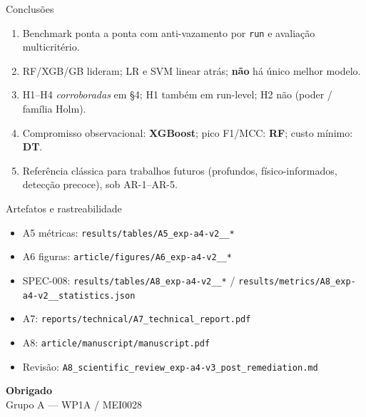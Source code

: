 \documentclass[aspectratio=169,11pt]{beamer}
\begin{document}
\begin{frame}{Conclusões}
\begin{enumerate}
  \item Benchmark ponta a ponta com anti-vazamento por \texttt{run} e avaliação multicritério.
  \item RF/XGB/GB lideram; LR e SVM linear atrás; \textbf{não} há único melhor modelo.
  \item H1--H4 \emph{corroboradas} em §4; H1 também em run-level; H2 não (poder / família Holm).
  \item Compromisso observacional: \textbf{XGBoost}; pico F1/MCC: \textbf{RF}; custo mínimo: \textbf{DT}.
  \item Referência clássica para trabalhos futuros (profundos, físico-informados, detecção precoce),
        sob AR-1--AR-5.
\end{enumerate}
\end{frame}

\begin{frame}{Artefatos e rastreabilidade}
\begin{itemize}
  \item A5 métricas: \texttt{results/tables/A5\_exp-a4-v2\_\_*}
  \item A6 figuras: \texttt{article/figures/A6\_exp-a4-v2\_\_*}
  \item SPEC-008: \texttt{results/tables/A8\_exp-a4-v2\_\_*} /
        \texttt{results/metrics/A8\_exp-a4-v2\_\_statistics.json}
  \item A7: \texttt{reports/technical/A7\_technical\_report.pdf}
  \item A8: \texttt{article/manuscript/manuscript.pdf}
  \item Revisão: \texttt{A8\_scientific\_review\_exp-a4-v3\_post\_remediation.md}
\end{itemize}
\bigskip
\begin{center}
\textbf{Obrigado}\\[0.5em]
{\small Grupo A --- WP1A / MEI0028}
\end{center}
\end{frame}
\end{document}
